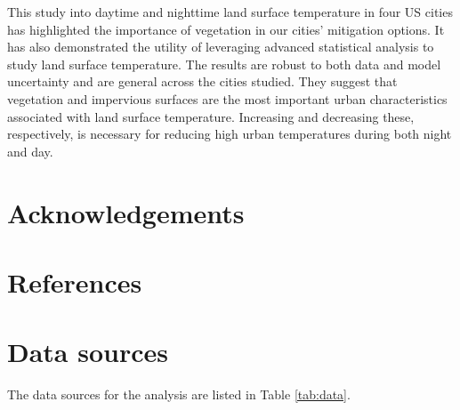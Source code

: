 \documentclass[review]{elsarticle}
\begin{document}
This study into daytime and nighttime land surface temperature in four US cities has highlighted the importance of vegetation in our cities' mitigation options. 
It has also demonstrated the utility of leveraging advanced statistical analysis to study land surface temperature.
The results are robust to both data and model uncertainty and are general across the cities studied.
They suggest that vegetation and impervious surfaces are the most important urban characteristics associated with land surface temperature.
Increasing and decreasing these, respectively, is necessary for reducing high urban temperatures during both night and day.


\section*{Acknowledgements}

\section*{References}
\singlespacing



\newpage
\onecolumn
\appendix

\section{Data sources}
The data sources for the analysis are listed in Table \ref{tab:data}.
\end{document}
